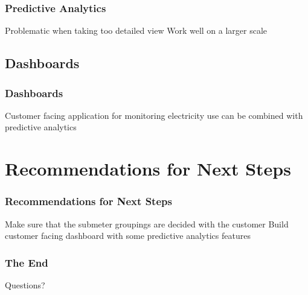 \documentclass[10pt]{beamer}
\begin{document}
\begin{frame}
\frametitle{Predictive Analytics}

Problematic when taking too detailed view
Work well on a larger scale

\end{frame}

\subsection{Dashboards}

\begin{frame}
\frametitle{Dashboards}

Customer facing application for monitoring electricity use
can be combined with predictive analytics

\end{frame}


\section{Recommendations for Next Steps}


\begin{frame}
\frametitle{Recommendations for Next Steps}

Make sure that the submeter groupings are decided with the customer
Build customer facing dashboard with some predictive analytics features

\end{frame}

\begin{frame}
\frametitle{The End}

\LARGE{\centerline{Questions?}}

\end{frame}

\end{document}
